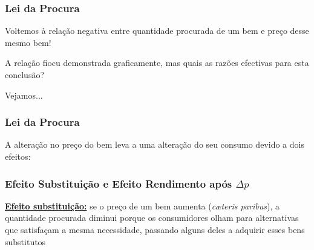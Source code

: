\begin{frame}
\begin{center}
		\end{center}
\end{frame}


\begin{frame}
	\frametitle{Lei da Procura}
	Voltemos \`a rela\c c\~ao negativa entre quantidade procurada de um bem e pre\c co desse mesmo bem!

	\vspace{0.5cm}

	A rela\c c\~ao fiocu demonstrada graficamente, mas quais as raz\~oes efectivas para esta conclus\~ao?

	\vspace{0.4cm}

	Vejamos...
\end{frame}

\begin{frame}
	\frametitle{Lei da Procura}
	\begin{center}
	\LARGE A altera\c c\~ao no pre\c co do bem leva a uma altera\c c\~ao do seu consumo devido a dois efeitos:
	\end{center}
\end{frame}

\begin{frame}
	\frametitle{Efeito Substitui\c c\~ao e Efeito Rendimento ap\'os $\Delta p$}

	\textbf{\underline{Efeito substitui\c c\~ao:}} se o pre\c co de um bem aumenta (\emph{c\ae teris paribus}), a quantidade procurada diminui porque os consumidores olham para alternativas que satisfa\c cam a mesma necessidade, passando alguns deles a adquirir esses bens substitutos
\end{frame}

